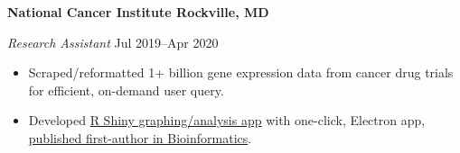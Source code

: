 \textbf{National Cancer Institute \hfill Rockville, MD}\par

\textit{Research Assistant} \hfill Jul 2019--Apr 2020 \par
\begin{itemize}
	\item Scraped/reformatted 1+ billion gene expression data from cancer drug trials for efficient, on-demand user query.
	\item Developed \href{https://github.com/petezh/TP-Workbench}{R Shiny graphing/analysis  app} with one-click, Electron app, \href{https://academic.oup.com/bioinformatics/advance-article/doi/10.1093/bioinformatics/btab619/6358719?login=true}{published first-author in Bioinformatics}.
\end{itemize}\par